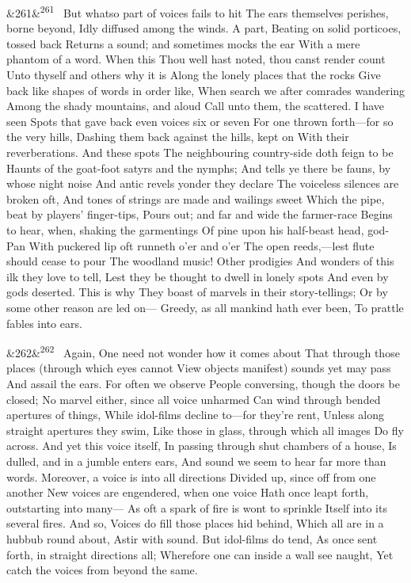 \documentclass[12pt]{article}
\newcommand{\para}[1][]{\par\noindent\ifx&#1&\else\textsuperscript{\footnotesize #1}~\fi}
\begin{document}
\para[261] But whatso part of voices fails to hit The ears themselves perishes, borne beyond, Idly diffused among the winds. A part, Beating on solid porticoes, tossed back Returns a sound; and sometimes mocks the ear With a mere phantom of a word. When this Thou well hast noted, thou canst render count Unto thyself and others why it is Along the lonely places that the rocks Give back like shapes of words in order like, When search we after comrades wandering Among the shady mountains, and aloud Call unto them, the scattered. I have seen Spots that gave back even voices six or seven For one thrown forth---for so the very hills, Dashing them back against the hills, kept on With their reverberations. And these spots The neighbouring country-side doth feign to be Haunts of the goat-foot satyrs and the nymphs; And tells ye there be fauns, by whose night noise And antic revels yonder they declare The voiceless silences are broken oft, And tones of strings are made and wailings sweet Which the pipe, beat by players' finger-tips, Pours out; and far and wide the farmer-race Begins to hear, when, shaking the garmentings Of pine upon his half-beast head, god-Pan With puckered lip oft runneth o'er and o'er The open reeds,---lest flute should cease to pour The woodland music! Other prodigies And wonders of this ilk they love to tell, Lest they be thought to dwell in lonely spots And even by gods deserted. This is why They boast of marvels in their story-tellings; Or by some other reason are led on--- Greedy, as all mankind hath ever been, To prattle fables into ears.

\para[262] Again, One need not wonder how it comes about That through those places (through which eyes cannot View objects manifest) sounds yet may pass And assail the ears. For often we observe People conversing, though the doors be closed; No marvel either, since all voice unharmed Can wind through bended apertures of things, While idol-films decline to---for they're rent, Unless along straight apertures they swim, Like those in glass, through which all images Do fly across. And yet this voice itself, In passing through shut chambers of a house, Is dulled, and in a jumble enters ears, And sound we seem to hear far more than words. Moreover, a voice is into all directions Divided up, since off from one another New voices are engendered, when one voice Hath once leapt forth, outstarting into many--- As oft a spark of fire is wont to sprinkle Itself into its several fires. And so, Voices do fill those places hid behind, Which all are in a hubbub round about, Astir with sound. But idol-films do tend, As once sent forth, in straight directions all; Wherefore one can inside a wall see naught, Yet catch the voices from beyond the same.
\end{document}
